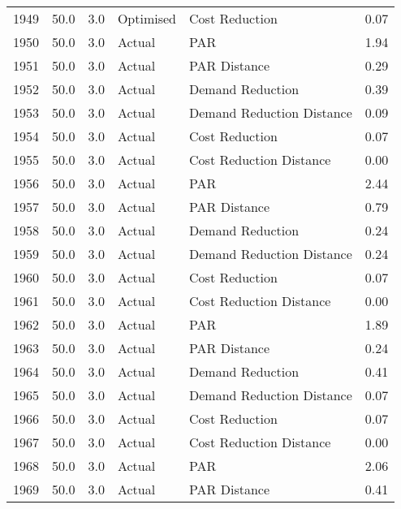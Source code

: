 \begin{longtable}{lrrllr}
1949 &         50.0 &     3.0 &      Optimised &             Cost Reduction &   0.07 \\
1950 &         50.0 &     3.0 &         Actual &                        PAR &   1.94 \\
1951 &         50.0 &     3.0 &         Actual &               PAR Distance &   0.29 \\
1952 &         50.0 &     3.0 &         Actual &           Demand Reduction &   0.39 \\
1953 &         50.0 &     3.0 &         Actual &  Demand Reduction Distance &   0.09 \\
1954 &         50.0 &     3.0 &         Actual &             Cost Reduction &   0.07 \\
1955 &         50.0 &     3.0 &         Actual &    Cost Reduction Distance &   0.00 \\
1956 &         50.0 &     3.0 &         Actual &                        PAR &   2.44 \\
1957 &         50.0 &     3.0 &         Actual &               PAR Distance &   0.79 \\
1958 &         50.0 &     3.0 &         Actual &           Demand Reduction &   0.24 \\
1959 &         50.0 &     3.0 &         Actual &  Demand Reduction Distance &   0.24 \\
1960 &         50.0 &     3.0 &         Actual &             Cost Reduction &   0.07 \\
1961 &         50.0 &     3.0 &         Actual &    Cost Reduction Distance &   0.00 \\
1962 &         50.0 &     3.0 &         Actual &                        PAR &   1.89 \\
1963 &         50.0 &     3.0 &         Actual &               PAR Distance &   0.24 \\
1964 &         50.0 &     3.0 &         Actual &           Demand Reduction &   0.41 \\
1965 &         50.0 &     3.0 &         Actual &  Demand Reduction Distance &   0.07 \\
1966 &         50.0 &     3.0 &         Actual &             Cost Reduction &   0.07 \\
1967 &         50.0 &     3.0 &         Actual &    Cost Reduction Distance &   0.00 \\
1968 &         50.0 &     3.0 &         Actual &                        PAR &   2.06 \\
1969 &         50.0 &     3.0 &         Actual &               PAR Distance &   0.41 \\

\end{longtable}
